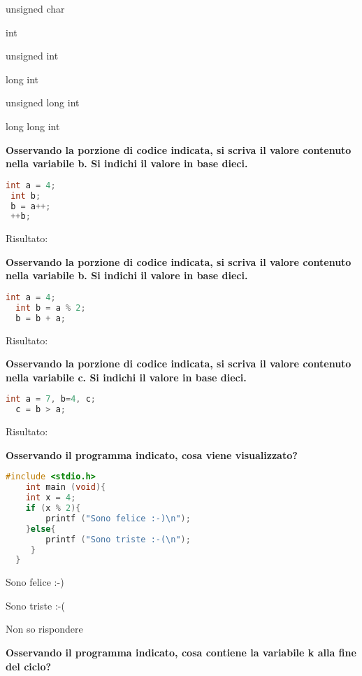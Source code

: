 \documentclass[9pt]{article}
\begin{document}
\begin{enumerate}
{\item[$\square$] unsigned char
\item[$\square$] int
\item[$\square$] unsigned int
\item[$\square$] long int
\item[$\square$] unsigned long int
\item[$\square$] long long int

\item [\nonumber]
 \item {\bf Osservando la porzione di codice indicata, si scriva il valore contenuto nella variabile b. Si indichi il valore in base dieci.}
  \begin{lstlisting}[language=c]
 int a = 4;
 int b; 
 b = a++;
 ++b;
 \end{lstlisting}
 Risultato: 
 \item [\nonumber]
 \item{\bf Osservando la porzione di codice indicata, si scriva il valore contenuto nella variabile b. Si indichi il valore in base dieci.}
 
  \begin{lstlisting}[language=c]
  int a = 4;
  int b = a % 2;
  b = b + a;
 \end{lstlisting}
  Risultato: 
  \item [\nonumber]
  \item {\bf Osservando la porzione di codice indicata, si scriva il valore contenuto nella variabile c. Si indichi il valore in base dieci.}
 
  \begin{lstlisting}[language=c]
  int a = 7, b=4, c;
  c = b > a;
  \end{lstlisting}
  Risultato: 
  \item [\nonumber]
  \item {\bf Osservando il programma indicato, cosa viene visualizzato?}
  
  \begin{lstlisting}[language=c]
   #include <stdio.h>
    int main (void){
    int x = 4;
    if (x % 2){
    	printf ("Sono felice :-)\n");
    }else{
    	printf ("Sono triste :-(\n");
     }
  }
 \end{lstlisting}   
 
\item[$\square$] Sono felice :-)
\item[$\square$] Sono triste :-(
\item[$\square$] Non so rispondere
\item [\nonumber]
\item {\bf Osservando il programma indicato, cosa contiene la variabile k alla fine del ciclo?}

}
\end{enumerate}
\end{document}
